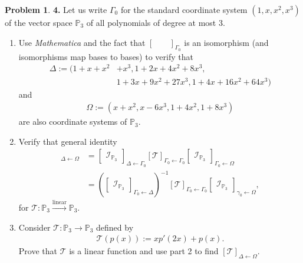 \documentclass{article}
\theoremstyle{definition}
\newtheorem*{prob*}{Problem}
\begin{document}
\begin{prob*}\textbf{4.} Let us write $\Gamma_0$ for the standard coordinate system $(1,x,x^2,x^3)$ of the vector space $\mathbb{P}_3$ of all polynomials of degree at most 3. 
	\begin{enumerate}
		\item Use \textit{Mathematica} and the fact that $\begin{bmatrix}\,&\,\end{bmatrix}_{\Gamma_0}$ is an isomorphism (and isomorphisms map bases to bases) to verify that 
		\begin{align*}
		\Delta := (1 + x + x^2 &+ x^3, 1 + 2x+4x^2 + 8x^3,\\
		&1 + 3x+9x^2 + 27x^3, 1+ 4x +16x^2 + 64x^3)
		\end{align*}
		and 
		\begin{align*}
		\Omega := (x+x^2, x-6x^3, 1 + 4x^2, 1+ 8x^3) 
		\end{align*}
		are also coordinate systems of $\mathbb{P}_3$.
	


	\item Verify that general identity
	\begin{align*}
	[\mathcal{T}]_{\Delta \leftarrow \Omega} &= 
	\begin{bmatrix}
	\mathcal{I}_{\mathbb{P}_3}
	\end{bmatrix}_{\Delta \leftarrow \Gamma_0} [\mathcal{T}]_{\Gamma_0 \leftarrow \Gamma_0} 
	\begin{bmatrix}
	\mathcal{I}_{\mathbb{P}_3}
	\end{bmatrix}_{\Gamma_0 \leftarrow \Omega}\\
	&= \left(\begin{bmatrix}
	\mathcal{I}_{\mathbb{P}_3}
	\end{bmatrix}_{\Gamma_0 \leftarrow \Delta}\right)^{-1} [\mathcal{T}]_{\Gamma_0 \leftarrow \Gamma_0} 
	\begin{bmatrix}
	\mathcal{I}_{\mathbb{P}_3}
	\end{bmatrix}_{\gamma_0 \leftarrow \Omega},
	\end{align*}
	for $\mathcal{T} : \mathbb{P}_3 \overset{\text{linear}}{\longrightarrow} \mathbb{P}_3$.
	
	
	\item Consider $\mathcal{T} : \mathbb{P}_3 \rightarrow \mathbb{P}_3$ defined by 
	\begin{align*}
	\mathcal{T}(p(x)) := xp'(2x) + p(x).
	\end{align*}
	Prove that $\mathcal{T}$ is a linear function and use part 2 to find $[\mathcal{T}]_{\Delta\leftarrow \Omega}$.
	

\end{enumerate}
\end{prob*}
\end{document}

